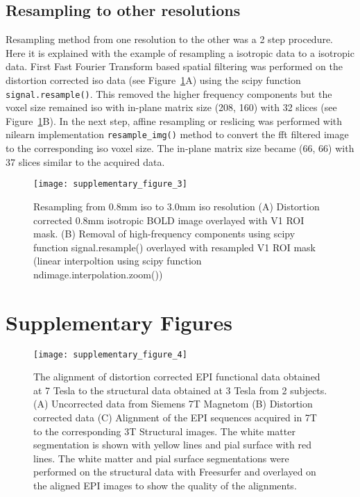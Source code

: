 \subsection*{Resampling to other resolutions}

Resampling method from one resolution to the other was a 2 step procedure. 
Here it is explained with the example of resampling a  isotropic 
data to a  isotropic data. First Fast Fourier Transform based spatial filtering was 
performed on the distortion corrected  iso data (see Figure~\ref{fig:resample_r08_r30}A)
using the scipy function \texttt{signal.resample()}. This removed the higher frequency 
components but the voxel size remained  iso with in-plane matrix 
size (208, 160) with 32 slices (see Figure~\ref{fig:resample_r08_r30}B). 
In the next step, affine resampling or reslicing was performed with 
nilearn implementation \texttt{resample\_img()} method to convert 
the fft filtered image to the corresponding  iso voxel size. 
The in-plane matrix size became (66, 66) with 37 slices similar to the 
acquired  data.

\begin{figure} \centering
  \texttt{[image: supplementary\_figure\_3]}
  \caption{
	Resampling from 0.8mm iso to 3.0mm iso resolution (A) Distortion 
    corrected 0.8mm isotropic BOLD image overlayed with V1 ROI mask. 
    (B) Removal of high-frequency components using scipy function signal.resample() 
    overlayed with resampled V1 ROI mask (linear interpoltion using 
    scipy function ndimage.interpolation.zoom())
  }

    \label{fig:resample_r08_r30}
\end{figure}


\section*{Supplementary Figures}

\begin{figure} \centering
  \texttt{[image: supplementary\_figure\_4]}
  \caption{
	The alignment of distortion corrected EPI functional data obtained at 7 
	Tesla to the structural data obtained at 3 Tesla from 2 subjects. 
	(A) Uncorrected data from Siemens 7T Magnetom 
	(B) Distortion corrected data \citep{in_2012}
	(C) Alignment of the EPI sequences acquired in 7T to 
	the corresponding 3T Structural images. The white matter 
	segmentation is shown with yellow lines and pial surface with red 
	lines. The white matter and pial surface segmentations were 
	performed on the structural data with Freesurfer and overlayed on 
	the aligned EPI images to show the quality of the alignments.   
  }
\end{figure}



